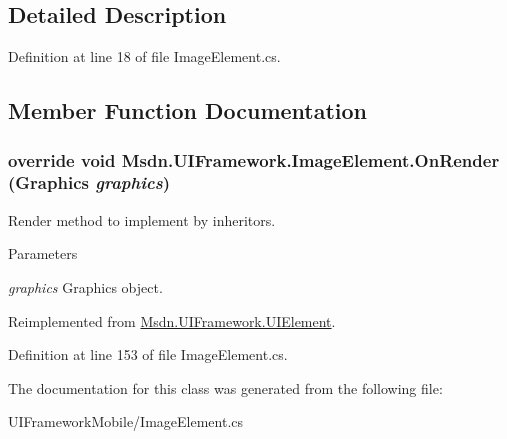 \subsection{Detailed Description}


Definition at line 18 of file ImageElement.cs.

\subsection{Member Function Documentation}
\hypertarget{class_msdn_1_1_u_i_framework_1_1_image_element_acf50352e5c1e7d09d308d32362fda263}{
\subsubsection[{OnRender}]{\setlength{\rightskip}{0pt plus 5cm}override void Msdn.UIFramework.ImageElement.OnRender (Graphics {\em graphics})}}
\label{class_msdn_1_1_u_i_framework_1_1_image_element_acf50352e5c1e7d09d308d32362fda263}


Render method to implement by inheritors. 
\begin{DoxyParams}{Parameters}
\item[{\em graphics}]Graphics object.\end{DoxyParams}


Reimplemented from \hyperlink{class_msdn_1_1_u_i_framework_1_1_u_i_element_a20b2245806231553935896fe7731812b}{Msdn.UIFramework.UIElement}.

Definition at line 153 of file ImageElement.cs.

The documentation for this class was generated from the following file:\begin{DoxyCompactItemize}
\item 
UIFrameworkMobile/ImageElement.cs\end{DoxyCompactItemize}
